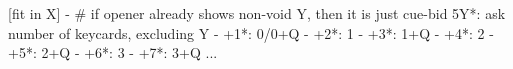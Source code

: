 [fit in X] - 
# if opener already shows non-void Y, then it is just cue-bid
5Y*: ask number of keycards, excluding Y
   - +1*: 0/0+Q
   - +2*: 1
   - +3*: 1+Q
   - +4*: 2
   - +5*: 2+Q
   - +6*: 3
   - +7*: 3+Q
   ...